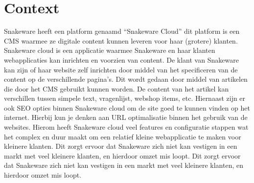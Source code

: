 \section{Context}
Snakeware heeft een platform genaamd “Snakeware Cloud” dit platform is een \gls{CMS} waarmee ze digitale content kunnen leveren voor haar (grotere) klanten.
Snakeware cloud is een applicatie waarmee Snakeware en haar klanten webapplicaties kan inrichten en voorzien van content.%
\whitespace
De klant van Snakeware kan zijn of haar website zelf inrichten door middel van het specificeren van de content op de verschillende pagina's.
Dit wordt gedaan door middel van artikelen die door het \gls{CMS} gebruikt kunnen worden.
De content van het artikel kan verschillen tussen simpele text, vragenlijst, webshop items, etc.
Hiernaast zijn er ook \gls{SEO} opties binnen Snakeware cloud om de site goed te kunnen vinden op het internet.
Hierbij kun je denken aan URL optimalisatie binnen het gebruik van de websites.
Hierom heeft Snakeware cloud veel features en configuratie stappen wat het complex en duur maakt om een relatief kleine webapplicatie te maken voor kleinere klanten.
\whitespace
Dit zorgt ervoor dat Snakeware zich niet kan vestigen in een markt met veel kleinere klanten,
en hierdoor omzet mis loopt.
Dit zorgt ervoor dat Snakeware zich niet kan vestigen in een markt met veel kleinere klanten, en hierdoor omzet mis loopt.
